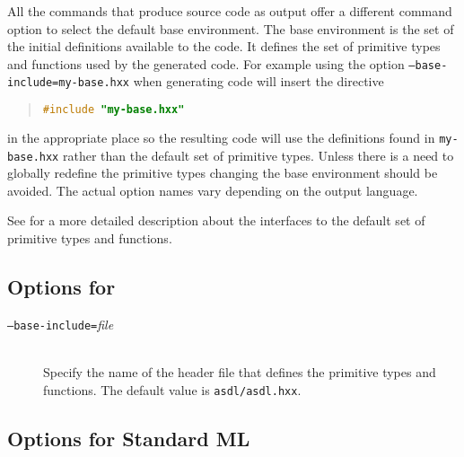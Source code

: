All the commands that produce source code as output offer a different
command option to select the default base environment.
The base environment is the set of the initial definitions available to the code.
It defines the set of primitive types and functions used by the generated code.
For example using the option \texttt{--base-include=my-base.hxx}
when generating \Cplusplus{} code will insert the directive
\begin{quote}\begin{lstlisting}[language=c++]
#include "my-base.hxx"
\end{lstlisting}\end{quote}%
in the appropriate place so the resulting code will use the definitions found in
\texttt{my-base.hxx} rather than the default set of primitive types.
Unless there is a need to globally redefine
the primitive types changing the base environment should be avoided.
The actual option names vary depending on the output language.

See  for a more detailed description about the interfaces
to the default set of primitive types and functions.

\subsection*{Options for \Cplusplus}

\begin{description}
  \item[\normalfont\texttt{--base-include=}\textit{file}] \mbox{}\\
    Specify the name of the \Cplusplus{} header file that defines the primitive \asdl{} types
    and functions.
    The default value is \texttt{asdl/asdl.hxx}.
\end{description}%

\subsection*{Options for Standard ML}

